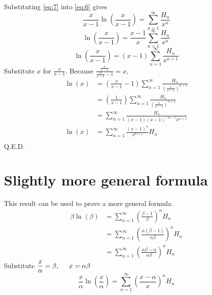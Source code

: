 \documentclass[11pt]{article}
\begin{document}
  \vspace{0.5cm}

Substituting \eqref{eq:7} into \eqref{eq:6} gives
$$\frac{x}{x-1}\ln\left(\frac{x}{x-1} \right )=\sum_{n=1}^{\infty}{\frac{H_{n}}{x^n}}$$
$$\ln\left(\frac{x}{x-1} \right )=\frac{x-1}{x}\sum_{n=1}^{\infty}{\frac{H_{n}}{x^n}}$$
$$\ln\left(\frac{x}{x-1} \right )=\left(x-1 \right )\sum_{n=1}^{\infty}{\frac{H_{n}}{x^{n+1}}}$$
Substitute $x$ for $\displaystyle\frac{x}{x-1}$. Because $\displaystyle\frac{\frac{x}{x-1}}{\frac{x}{x-1}-1}=x$, 
    \begin{align*}
\ln\left(x \right )&=\left(\frac{x}{x-1}-1 \right )\sum_{n=1}^{\infty}{\frac{H_{n}}{{\left(\frac{x}{x-1}\right)}^{n+1}}}\\
&=\left(\frac{1}{x-1} \right )\sum_{n=1}^{\infty}{\frac{H_{n}}{{\left(\frac{x}{x-1}\right)}^{n+1}}}\\
&=\sum_{n=1}^{\infty}{\frac{H_{n}}{\left(x-1 \right ){\left(x-1 \right )}^{-n-1}x^{n+1}}}\\
\ln\left(x \right )&=\sum_{n=1}^{\infty}{\frac{{\left(x-1 \right )}^{n}}{x^{n+1}}H_{n}}\\
    \end{align*}
Q.E.D.

\section{Slightly more general formula}

This result can be used to prove a more general formula.
    \begin{align*}
\beta\ln\left(\beta \right )&=\sum_{n=1}^{\infty}{{\left(\frac{\beta-1}{\beta} \right )}^n H_{n}}\\
&=\sum_{n=1}^{\infty}{{\left(\frac{\alpha\left(\beta-1 \right )}{\alpha\beta} \right )}^n H_{n}}\\
&=\sum_{n=1}^{\infty}{{\left(\frac{\alpha\beta-\alpha}{\alpha\beta} \right )}^n H_{n}}
    \end{align*}
Substitute $\displaystyle\frac{x}{\alpha}=\beta,\hspace{0.5cm} x=\alpha\beta$
    $$\frac{x}{\alpha}\ln\left(\frac{x}{\alpha} \right )=\sum_{n=1}^{\infty}{{\left(\frac{x-\alpha}{x} \right )}^n H_{n}}$$
\end{document}
